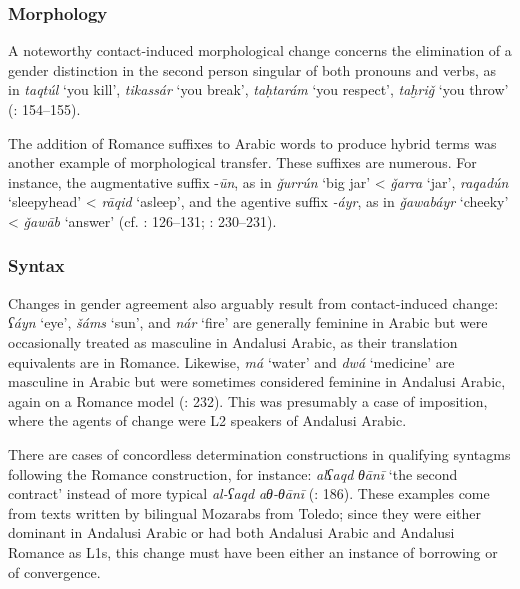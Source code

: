 \documentclass[output=paper,modfonts,nonflat]{langsci/langscibook}
\begin{document}
\subsubsection{Morphology}

A noteworthy contact-induced morphological change concerns the elimination of a gender distinction in the second person singular of both pronouns and verbs, as in \textit{taqtúl} ‘you kill’, \textit{tikassár} ‘you break’, \textit{taḥtarám} ‘you respect’, \textit{taḫriǧ} ‘you throw’ (\citealt{CorrientePereiraVicente2015}: 154–155).

The addition of Romance suffixes to Arabic words to produce hybrid terms was another example of morphological transfer. These suffixes are numerous. For instance, the augmentative suffix -\textit{ūn}, as in \textit{ǧurrún} ‘big jar’ < \textit{ǧarra} ‘jar’, \textit{raqadún} ‘sleepyhead’ < \textit{rāqid} ‘asleep’, and the agentive suffix \textit{-áyr}, as in \textit{ǧawabáyr} ‘cheeky’ < \textit{ǧawāb} `answer' (cf. \citealt{Corriente1992book}: 126–131; \citealt{CorrientePereiraVicente2015}: 230–231). 


\subsubsection{Syntax}

Changes in gender agreement also arguably result from contact-induced change: \textit{ʕáyn} ‘eye’, \textit{šáms} ‘sun’, and \textit{nár} ‘fire’ are generally feminine in Arabic but were occasionally treated as masculine in Andalusi Arabic, as their translation equivalents are in Romance. Likewise, \textit{má} ‘water’ and \textit{dwá} ‘medicine’ are masculine in Arabic but were sometimes considered feminine in Andalusi Arabic, again on a Romance model (\citealt{CorrientePereiraVicente2015}: 232). This was presumably a case of imposition, where the agents of change were L2 speakers of Andalusi Arabic. 

There are cases of concordless determination constructions in qualifying syntagms following the Romance construction, for instance: \textit{alʕaqd} \textit{θānī} ‘the second contract’ instead of more typical \textit{al-ʕaqd} \textit{aθ-θānī} (\citealt{CorrientePereiraVicente2015}: 186). These examples come from texts written by bilingual Mozarabs from Toledo; since they were either dominant in Andalusi Arabic or had both Andalusi Arabic and Andalusi Romance as L1s, this change must have been either an instance of borrowing or of convergence. 
\end{document}
